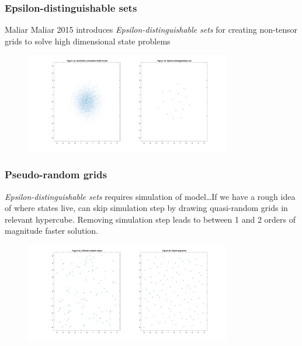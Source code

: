 \documentclass[10pt]{beamer}
\begin{document}
  \begin{frame} \frametitle{Epsilon-distinguishable sets}

    Maliar Maliar 2015 introduces \textit{Epsilon-distinguishable sets} for creating non-tensor
    grids to solve high dimensional state problems

    \begin{figure}
      \includegraphics[width=0.8\textwidth]{../ms/images/CLMM/Figure1-eps-converted-to.pdf}
    \end{figure}

  \end{frame}

  \begin{frame} \frametitle{Pseudo-random grids}

    \textit{Epsilon-distinguishable sets} requires simulation of model\dots If we have a rough idea
    of where states live, can skip simulation step by drawing quasi-random grids in relevant
    hypercube. Removing simulation step leads to between 1 and 2 orders of magnitude faster
    solution.

    \begin{figure}
      \includegraphics[width=0.8\textwidth]{../ms/images/CLMM/Figure2-eps-converted-to.pdf}
    \end{figure}

  \end{frame}

\end{document}
